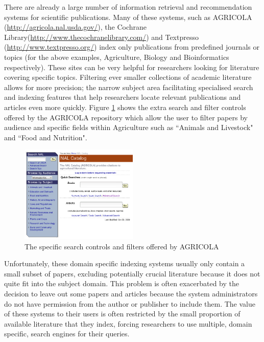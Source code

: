 There are already a large number of information retrieval and recommendation
systems for scientific publications.  Many of these systems, such as AGRICOLA
(\url{http://agricola.nal.usda.gov/}), the Cochrane
Library(\url{http://www.thecochranelibrary.com/}) and
Textpresso (\url{http://www.textpresso.org/}) index only publications
from predefined journals or topics (for the above examples, Agriculture,
Biology and Bioinformatics respectively). These sites can be very helpful for
researchers looking for literature covering specific topics. Filtering ever
smaller collections of academic literature allows for more precision; the
narrow subject area facilitating specialised search and indexing features that
help researchers locate relevant publications and articles even more quickly.
Figure \ref{fig:agricola} shows the extra search and filter controls offered by
the AGRICOLA repository which allow the user to filter papers by audience and
specific fields within Agriculture such as ``Animals and Livestock" and ``Food
and Nutrition".

\begin{figure}[!h]
\centering
\includegraphics[width=0.5\textwidth]{images/litreview/agricola.png}
\caption{The specific search controls and filters offered by AGRICOLA}
\label{fig:agricola}
\end{figure}

Unfortunately, these domain specific indexing systems usually only contain a
small subset of papers, excluding potentially crucial literature because it
does not quite fit into the subject domain. This problem is often exacerbated
by the decision to leave out some papers and articles because the system
administrators do not have permission from the author or publisher to include
them. The value of these systems to their users is often restricted by the
small proportion of available literature that they index, forcing researchers
to use multiple, domain specific, search engines for their queries.

